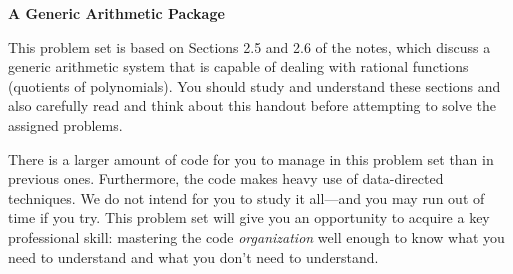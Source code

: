 
%


\newcommand{\Code}[1]{\mbox{\tt #1}}

\outer\def\beginlispbig{%
  \begin{minipage}[t]{\linewidth}
  \begin{list}{$\bullet$}{%
    \setlength{\topsep}{0in}
    \setlength{\partopsep}{0in}
    \setlength{\itemsep}{0in}
    \setlength{\parsep}{0in}
    \setlength{\leftmargin}{1.5em}
    \setlength{\rightmargin}{0in}
    \setlength{\itemindent}{0in}
  }\item[]
  \obeyspaces
  \obeylines \tt}


\def\fbox#1{%
  \vtop{\vbox{\hrule%
     \hbox{\vrule\kern3pt%
 \vtop{\vbox{\kern3pt#1}\kern3pt}%
 \kern3pt\vrule}}%
 \hrule}}

\let\to\rightarrow
\let\union\cup
\let\cross\times


\def\SI{\mbox{Sch-\-Int}}
\def\SNat{\mbox{Sch-\-NatNum}}
\def\SN{\mbox{Sch-\-Num}}
\def\SB{\mbox{Sch-\-Bool}}
\def\Empty{\mbox{Empty}}
\def\SI{\mbox{Sch-\-Int}}
\def\SSYM{\mbox{Sch-\-Symbol}}
\def\GN{\mbox{Generic-\-Num}}
\def\RN{\mbox{RepNum}}
\def\RR{\mbox{RepRat}}
\def\RP{\mbox{RepPoly}}
\def\RT{\mbox{RepTerm}}
\def\RTS{\mbox{RepTerms}}
\def\TL{\List(\RT)}
\def\Var{\mbox{Variable}}
\def\RP{\mbox{RepPoly}}
\def\Empty{\mbox{Empty-type}}
\def\List{\mbox{List}}
\def\GOP2{\mbox{Gen-binary-op}}

\def\numtag{\Code{number}}
\def\rattag{\Code{rational}}
\def\polytag{\Code{polynomial}}


\begin{center}\large
{\bf A Generic Arithmetic Package}
\end{center}

\medskip

\noindent
This problem set is based on Sections 2.5 and 2.6 of the notes, which
discuss a generic arithmetic system that is capable of dealing with
rational functions (quotients of polynomials).  You should study and
understand these sections and also carefully read and think about this
handout before attempting to solve the assigned problems.

There is a larger amount of code for you to manage in this problem set
than in previous ones.  Furthermore, the code makes heavy use of
data-directed techniques.  We do not intend for you to study it all---and
you may run out of time if you try.  This problem set will give you an
opportunity to acquire a key professional skill: mastering the code {\em
organization} well enough to know what you need to understand and what you
don't need to understand.

